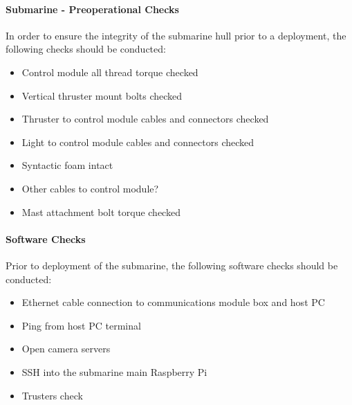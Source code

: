 \documentclass[
18pt, %
a4paper, %
oneside, %
headinclude,footinclude, %
]{scrartcl}
\begin{document}
\paragraph{Submarine - Preoperational Checks} In order to ensure the integrity of the submarine hull prior to a deployment, the following checks should be conducted:

\begin{itemize}[noitemsep] %
	\item Control module all thread torque checked
	\item Vertical thruster mount bolts checked
	\item Thruster to control module cables and connectors checked
	\item Light to control module cables and connectors checked
	\item Syntactic foam intact
	\item Other cables to control module?
	\item Mast attachment bolt torque checked
\end{itemize}

\paragraph{Software Checks} Prior to deployment of the submarine, the following software checks should be conducted:

\begin{itemize}[noitemsep] %
	\item Ethernet cable connection to communications module box and host PC
	\item Ping from host PC terminal
	\item Open camera servers
	\item SSH into the submarine main Raspberry Pi
	\item Trusters check
\end{itemize}
\end{document}
